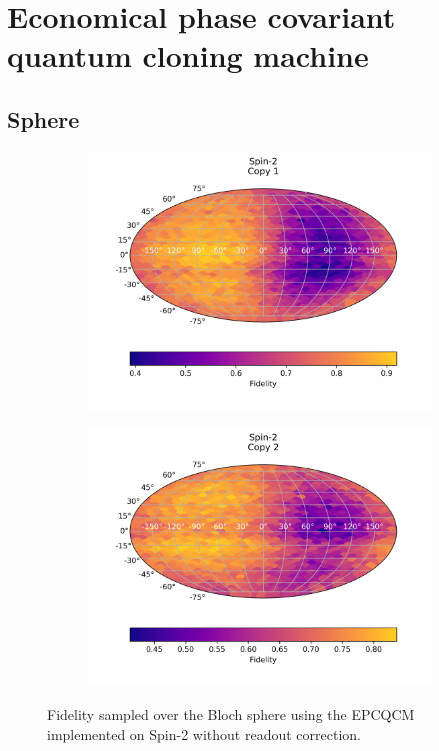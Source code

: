 \section{Economical phase covariant quantum cloning machine}
\subsection{Sphere}

\begin{figure}[H]
    \centering
    \begin{subfigure}{.5\textwidth}
      \centering
      \includegraphics[width=\textwidth]{Figures/Economical/Spin2/FullSphere/results_spin2_copy1.png}
      \label{fig:epc_uncorrected_spin_sphere_1}
    \end{subfigure}%
    \begin{subfigure}{.5\textwidth}
      \centering
      \includegraphics[width=\textwidth]{Figures/Economical/Spin2/FullSphere/results_spin2_copy2.png}
      \label{fig:epc_uncorrected_spin_sphere_2}
    \end{subfigure}
    \caption{Fidelity sampled over the Bloch sphere using the EPCQCM implemented on Spin-2 without readout correction.}
    \label{fig:epc_uncorrected_spin_sphere}
  \end{figure}
  \vspace{-0.5cm}

